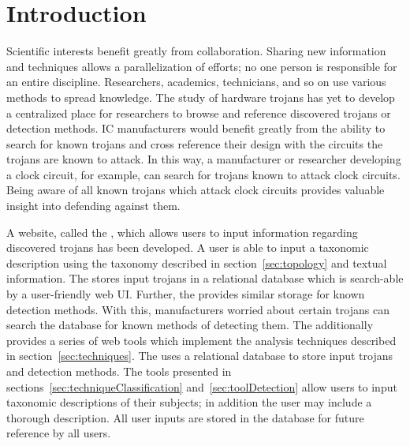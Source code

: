 \label{chapter:webSite}
\section{Introduction}
Scientific interests benefit greatly from collaboration.
Sharing new information and techniques allows a parallelization of efforts; no one person is responsible for an entire discipline.
Researchers, academics, technicians, and so on use various methods to spread knowledge.
The study of hardware trojans has yet to develop a centralized place for researchers to browse and reference discovered trojans or detection methods.
\acrfull{IC} manufacturers would benefit greatly from the ability to search for known trojans and cross reference their design with the circuits the trojans are known to attack.
In this way, a manufacturer or researcher developing a clock circuit, for example, can search for trojans known to attack clock circuits.
Being aware of all known trojans which attack clock circuits provides valuable insight into defending against them.

A website, called the \WebName, which allows users to input information regarding discovered trojans has been developed.
A user is able to input a taxonomic description using the taxonomy described in section~\ref{sec:topology} and textual information. 
The \WebNameNoPeriod stores input trojans in a relational database which is search-able by a user-friendly web \acrshort{UI}.
Further, the \WebNameNoPeriod provides similar storage for known detection methods. 
With this, manufacturers worried about certain trojans can search the database for known methods of detecting them. 
The \WebNameNoPeriod additionally provides a series of web tools which implement the analysis techniques described in section~\ref{sec:techniques}.
The \WebNameNoPeriod uses a relational database to store input trojans and detection methods.
The tools presented in sections~\ref{sec:techniqueClassification} and~\ref{sec:toolDetection} allow users to input taxonomic descriptions of their subjects; in addition the user may include a thorough description.
All user inputs are stored in the database for future reference by all users.
